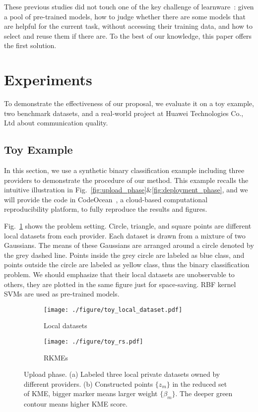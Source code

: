 \documentclass[paper=letter, fontsize=20pt]{article}
\begin{document}
These previous studies did not touch one of the key challenge of learnware~\citep{learnware}: given a pool of pre-trained models, how to judge whether there are some models that are helpful for the current task, without accessing their training data, and how to select and reuse them if there are. To the best of our knowledge, this paper offers the first solution.

\section{Experiments}
To demonstrate the effectiveness of our proposal, we evaluate it on a toy example, two benchmark datasets, and a real-world project at Huawei Technologies Co., Ltd about communication quality.
\subsection{Toy Example} \label{sec:toy}
In this section, we use a synthetic binary classification example including three providers to demonstrate the procedure of our method. This example recalls the intuitive illustration in Fig.~\ref{fig:upload_phase}\&\ref{fig:deployment_phase}, and we will provide the code in CodeOcean~\citep{codeocean}, a cloud-based computational reproducibility platform, to fully reproduce the results and figures.

Fig.~\ref{fig:toy_local_dataset} shows the problem setting. Circle, triangle, and square points are different local datasets from each provider. Each dataset is drawn from a mixture of two Gaussians. The means of these Gaussians are arranged around a circle denoted by the grey dashed line. Points inside the grey circle are labeled as blue class, and points outside the circle are labeled as yellow class, thus the binary classification problem. We should emphasize that their local datasets are unobservable to others, they are plotted in the same figure just for space-saving. RBF kernel SVMs are used as pre-trained models.
\begin{figure}[h]
\centering
\begin{subfigure}[b]{0.23\textwidth}
\captionsetup{skip=1pt}
\texttt{[image: ./figure/toy\_local\_dataset.pdf]}
\caption{Local datasets}\label{fig:toy_local_dataset}
\end{subfigure}
\begin{subfigure}[b]{0.23\textwidth}
\captionsetup{skip=1pt}
\texttt{[image: ./figure/toy\_rs.pdf]}
\caption{RKMEs}\label{fig:toy_rs}
\end{subfigure}
 \caption{Upload phase. (a) Labeled three local private datasets owned by different providers. (b) Constructed points $\{z_m\}$ in the reduced set of KME, bigger marker means larger weight $\{\beta_m\}$. The deeper green contour means higher KME score.}\label{fig:preparation}
\end{figure}
\end{document}
